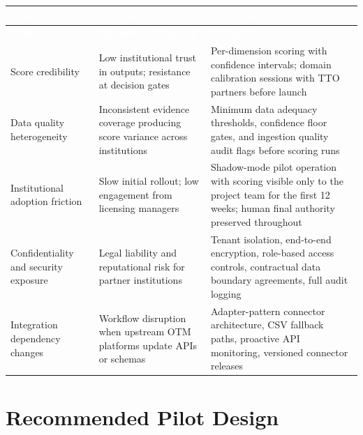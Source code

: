 \documentclass[11pt]{article}
\begin{document}
\begin{longtable}{L{3.6cm} L{3.9cm} L{5.6cm}}

  \textcolor{white}{\textbf{Risk}} &
  \textcolor{white}{\textbf{Operational Impact}} &
  \textcolor{white}{\textbf{Mitigation}} \\[2pt]
  \endfirsthead

  \textcolor{white}{\textbf{Risk}} &
  \textcolor{white}{\textbf{Operational Impact}} &
  \textcolor{white}{\textbf{Mitigation}} \\[2pt]
  \endhead

  Score credibility &
  Low institutional trust in outputs; resistance at decision gates &
  Per-dimension scoring with confidence intervals; domain calibration
  sessions with TTO partners before launch \\

  Data quality heterogeneity &
  Inconsistent evidence coverage producing score variance across institutions &
  Minimum data adequacy thresholds, confidence floor gates, and ingestion
  quality audit flags before scoring runs \\

  Institutional adoption friction &
  Slow initial rollout; low engagement from licensing managers &
  Shadow-mode pilot operation with scoring visible only to the project
  team for the first 12 weeks; human final authority preserved throughout \\

  Confidentiality and security exposure &
  Legal liability and reputational risk for partner institutions &
  Tenant isolation, end-to-end encryption, role-based access controls,
  contractual data boundary agreements, full audit logging \\

  Integration dependency changes &
  Workflow disruption when upstream OTM platforms update APIs or schemas &
  Adapter-pattern connector architecture, CSV fallback paths, proactive
  API monitoring, versioned connector releases \\[4pt]

\end{longtable}

\section{Recommended Pilot Design}
\end{document}
